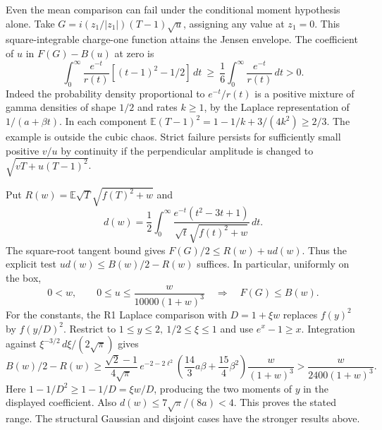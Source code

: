 \documentclass[11pt]{article}
\newcommand{\E}{\mathbb E}\newcommand{\C}{\mathbb C}\newcommand{\R}{\mathbb R}
\newcommand{\subhead}[1]{\par\smallskip{\bfseries\color{ink}#1}\enspace}
\begin{document}
Even the mean comparison can fail under the conditional moment hypothesis alone.
Take \(G=i(z_1/|z_1|)(T-1)\sqrt u\), assigning any value at \(z_1=0\).
This square-integrable charge-one function attains the Jensen envelope. The
coefficient of \(u\) in \(F(G)-B(u)\) at zero is
\[
 \int_0^\infty\frac{e^{-t}}{r(t)}[(t-1)^2-1/2]\,dt
 \ \ge\ \frac16\int_0^\infty\frac{e^{-t}}{r(t)}\,dt>0 .
\]
Indeed the probability density proportional to \(e^{-t}/r(t)\) is a positive
mixture of gamma densities of shape \(1/2\) and rates \(k\ge1\), by the Laplace
representation of \(1/(a+\beta t)\). In each component
\(\E(T-1)^2=1-1/k+3/(4k^2)\ge2/3\). The example is outside the cubic chaos.
Strict failure persists for sufficiently small positive \(v/u\) by continuity
if the perpendicular amplitude is changed to \(\sqrt{vT+u(T-1)^2}\).

\subhead{A positive region.}
Put \(R(w)=\E\sqrt T\sqrt{f(T)^2+w}\) and
\[
 d(w)=\frac12\int_0^\infty
 \frac{e^{-t}(t^2-3t+1)}{\sqrt t\sqrt{f(t)^2+w}}\,dt .
\]
The square-root tangent bound gives \(F(G)/2\le R(w)+u d(w)\). Thus the explicit
test \(u d(w)\le B(w)/2-R(w)\) suffices. In particular, uniformly on the box,
\[
 0<w,\qquad 0\le u\le\frac{w}{10000(1+w)^3}
 \quad\Longrightarrow\quad F(G)\le B(w).
\]
For the constants, the R1 Laplace comparison with \(D=1+\xi w\) replaces
\(f(y)^2\) by \(f(y/D)^2\). Restrict to \(1\le y\le2,\ 1/2\le\xi\le1\) and use
\(e^x-1\ge x\). Integration against \(\xi^{-3/2}\,d\xi/(2\sqrt\pi)\) gives
\[
 B(w)/2-R(w)\ge
 \frac{\sqrt2-1}{4\sqrt\pi}\,e^{-2-2\ell^2}
 \left(\frac{14}{3}a\beta+\frac{15}{4}\beta^2\right)\frac{w}{(1+w)^3}
 >\frac{w}{2400(1+w)^3}.
\]
Here \(1-1/D^2\ge1-1/D=\xi w/D\), producing the two moments of \(y\) in the
displayed coefficient. Also \(d(w)\le7\sqrt\pi/(8a)<4\). This proves the stated
range. The structural Gaussian and disjoint cases have the stronger results above.
\end{document}
